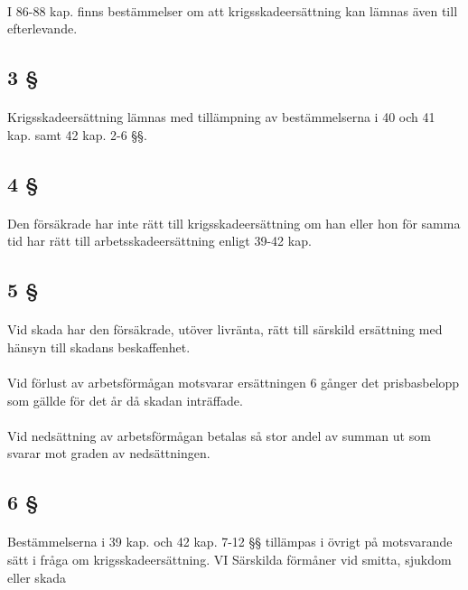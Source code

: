 \documentclass[a4paper,notitlepage,openany,10pt]{book}
\begin{document}
\paragraph*{}
I 86-88 kap. finns bestämmelser om att krigsskadeersättning kan lämnas även till efterlevande.
\subsection*{3 §}
\paragraph*{}
Krigsskadeersättning lämnas med tillämpning av bestämmelserna i 40 och 41 kap. samt 42 kap. 2-6 §§.
\subsection*{4 §}
\paragraph*{}
Den försäkrade har inte rätt till krigsskadeersättning om han eller hon för samma tid har rätt till arbetsskadeersättning enligt 39-42 kap.
\subsection*{5 §}
\paragraph*{}
Vid skada har den försäkrade, utöver livränta, rätt till särskild ersättning med hänsyn till skadans beskaffenhet.
\paragraph*{}
Vid förlust av arbetsförmågan motsvarar ersättningen 6 gånger det prisbasbelopp som gällde för det år då skadan inträffade.
\paragraph*{}
Vid nedsättning av arbetsförmågan betalas så stor andel av summan ut som svarar mot graden av nedsättningen.
\subsection*{6 §}
\paragraph*{}
Bestämmelserna i 39 kap. och 42 kap. 7-12 §§ tillämpas i övrigt på motsvarande sätt i fråga om krigsskadeersättning.
VI Särskilda förmåner vid smitta, sjukdom eller skada
\end{document}
